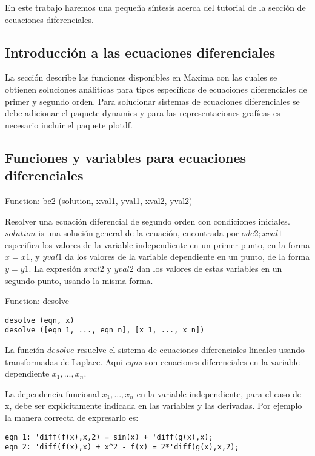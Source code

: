 \documentclass[12pt]{article}
\begin{document}
En este trabajo haremos una pequeña síntesis acerca del tutorial de la sección de ecuaciones diferenciales.


\subsection{Introducción a las ecuaciones diferenciales}

La sección describe las funciones disponibles en Maxima con las cuales se obtienen soluciones análiticas para tipos específicos de ecuaciones diferenciales de primer y segundo orden. Para solucionar sistemas de ecuaciones diferenciales se debe adicionar el paquete dynamics y para las representaciones grafícas es necesario incluir el paquete plotdf.

\subsection{Funciones y variables para ecuaciones diferenciales}

Function: bc2 (solution, xval1, yval1, xval2, yval2)

Resolver una ecuación diferencial de segundo orden con condiciones iniciales.
$solution$ is una solución general de la ecuación, encontrada por $ode2;xval1$ especifica los valores de la variable independiente en un primer punto, en la forma $x=x1$, y $yval1$ da los valores de la variable dependiente en un punto, de la forma $y= y1$. La expresión $xval2$ y $yval2$ dan los valores de estas variables en un segundo punto, usando la misma forma.

Function: desolve

\begin{verbatim}
desolve (eqn, x)
desolve ([eqn_1, ..., eqn_n], [x_1, ..., x_n])
\end{verbatim}

La función $desolve$ resuelve el sistema de ecuaciones diferenciales lineales usando transformadas de Laplace. Aqui $eqns$ son ecuaciones diferenciales en la variable dependiente $x_1, ..., x_n$.

La dependencia funcional $x_1, ..., x_n$ en la variable independiente, para el caso de x, debe ser explícitamente indicada en las variables y las derivadas. Por ejemplo la manera correcta de expresarlo es:

\begin{verbatim}
eqn_1: 'diff(f(x),x,2) = sin(x) + 'diff(g(x),x);
eqn_2: 'diff(f(x),x) + x^2 - f(x) = 2*'diff(g(x),x,2);
\end{verbatim}
\end{document}
